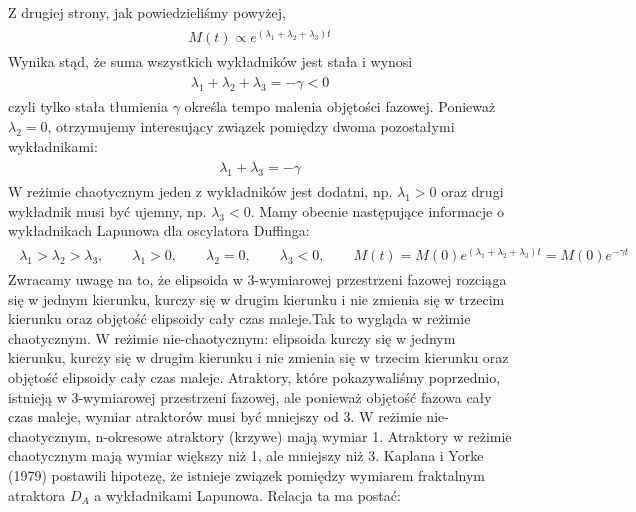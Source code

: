 \documentclass[a4paper,12pt,polish]{sphinxmanual}
\begin{document}
Z drugiej strony, jak powiedzieliśmy powyżej,
\label{ch2/chII012:equation-eqn14}\begin{gather}
\begin{split}M(t)  \propto e^{(\lambda_1 + \lambda_2 + \lambda_3) t}\end{split}\label{ch2/chII012-eqn14}
\end{gather}
Wynika stąd, że suma wszystkich wykładników jest stała i wynosi
\label{ch2/chII012:equation-eqn15}\begin{gather}
\begin{split}\lambda_1 + \lambda_2 + \lambda_3 = -\gamma  <  0\end{split}\label{ch2/chII012-eqn15}
\end{gather}
czyli tylko stała tłumienia $\gamma$ określa tempo malenia objętości fazowej.  Ponieważ $\lambda_2 =0$, otrzymujemy interesujący związek pomiędzy dwoma pozostałymi wykładnikami:
\label{ch2/chII012:equation-eqn16}\begin{gather}
\begin{split}\lambda_1 + \lambda_3 = -\gamma\end{split}\label{ch2/chII012-eqn16}
\end{gather}
W reżimie chaotycznym jeden z wykładników jest dodatni, np. $\lambda_1 >0$ oraz drugi wykładnik musi być ujemny, np. $\lambda_3 < 0$.  Mamy obecnie następujące informacje o wykładnikach Lapunowa dla oscylatora  Duffinga:
\label{ch2/chII012:equation-eqn17}\begin{gather}
\begin{split}\lambda_1  >  \lambda_2  >  \lambda_3, \qquad   \lambda_1 > 0, \qquad \lambda_2  = 0, \qquad   \lambda_3 < 0,  \qquad M(t) =  M(0)  e^{(\lambda_1 + \lambda_2 + \lambda_3) t} = M(0) e^{-\gamma t}\end{split}\label{ch2/chII012-eqn17}
\end{gather}
Zwracamy uwagę na to, że elipsoida  w 3-wymiarowej przestrzeni fazowej rozciąga się w jednym kierunku, kurczy się w drugim kierunku i nie zmienia się w trzecim kierunku  oraz objętość elipsoidy cały czas maleje.Tak to wygląda w reżimie chaotycznym. W reżimie nie-chaotycznym: elipsoida kurczy się  w jednym kierunku, kurczy się w drugim kierunku i nie zmienia się w trzecim kierunku  oraz objętość elipsoidy cały czas maleje. Atraktory, które pokazywaliśmy poprzednio, istnieją w 3-wymiarowej przestrzeni fazowej, ale ponieważ objętość fazowa cały czas maleje, wymiar atraktorów musi być mniejszy od 3. W reżimie nie-chaotycznym, n-okresowe atraktory  (krzywe) mają wymiar 1. Atraktory w reżimie chaotycznym mają wymiar większy niż 1, ale mniejszy niż 3. Kaplana i  Yorke (1979) postawili  hipotezę, że  istnieje związek pomiędzy wymiarem fraktalnym atraktora $D_A$  a wykładnikami Lapunowa. Relacja ta ma postać:
\end{document}

